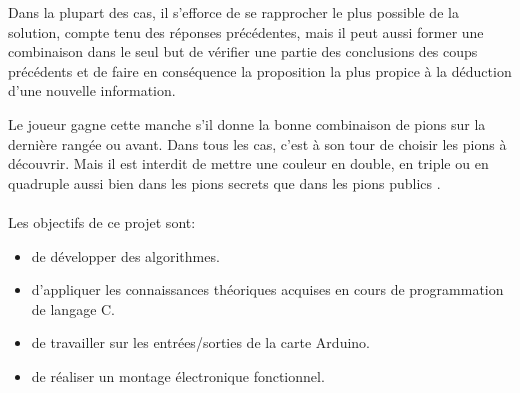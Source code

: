 	Dans la plupart des cas, il s'efforce de se rapprocher le plus possible de la solution, compte tenu des réponses précédentes, mais il peut aussi former une combinaison dans le seul but de vérifier une partie des conclusions des coups précédents et de faire en conséquence la proposition la plus propice à la déduction d'une nouvelle information.

	Le joueur gagne cette manche s'il donne la bonne combinaison de pions sur la dernière rangée ou avant. Dans tous les cas, c'est à son tour de choisir les pions à découvrir. 
Mais il est interdit de mettre une couleur en double, en triple ou en quadruple aussi bien dans les pions secrets que dans les pions \og publics \fg.

\paragraph{}
Les objectifs de ce projet sont:
\begin{itemize}
	\item de développer des algorithmes.
    \item d'appliquer les connaissances théoriques acquises en cours de programmation de langage C.
    \item de travailler sur les entrées/sorties de la carte Arduino.
    \item de réaliser un montage électronique fonctionnel.
\end{itemize}

